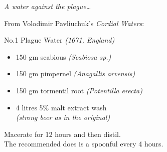 \documentclass[11pt]{report}
\begin{document}
    \begin{titlepage}
    

        \begin{multicols}{3}
            \raggedcolumns

            {
                \emph{A water against the plague\ldots}
                \vfill
            }

            \columnbreak

            {
                From Volodimir Pavliuchuk's \emph{Cordial Waters}:\\
            }

            \vspace*{2\baselineskip}

            {
                No.1 Plague Water \emph{(1671, England)}
                \vspace*{\baselineskip}
                \begin{itemize}
                    \renewcommand{\labelitemi}{$\circ$}
                    \item 150 gm scabious \emph{(Scabiosa sp.)}
                    \item 150 gm pimpernel \emph{(Anagallis arvensis)}
                    \item 150 gm tormentil root \emph{(Potentilla erecta)}
                    \item 4 litres 5\% malt extract wash\\
                        [0.4\baselineskip]
                        \emph{(strong beer as in the original)}
                \end{itemize}
                \vspace*{\baselineskip}
                Macerate for 12 hours and then distil.\\
                The recommended does is a spoonful every 4 hours.
            }

            \columnbreak
            \vspace*{3.2\baselineskip}


\end{multicols}
\end{titlepage}
\end{document}
